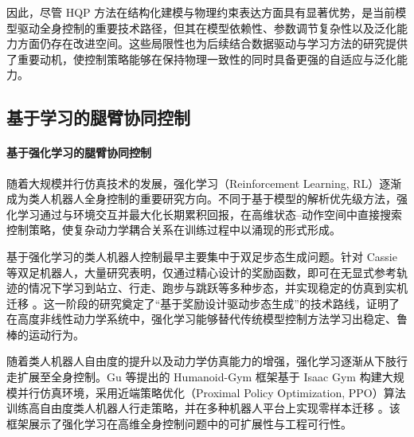 因此，尽管 HQP 方法在结构化建模与物理约束表达方面具有显著优势，是当前模型驱动全身控制的重要技术路径，但其在模型依赖性、参数调节复杂性以及泛化能力方面仍存在改进空间。这些局限性也为后续结合数据驱动与学习方法的研究提供了重要动机，使控制策略能够在保持物理一致性的同时具备更强的自适应与泛化能力。

\subsection{基于学习的腿臂协同控制}

\paragraph{基于强化学习的腿臂协同控制}

随着大规模并行仿真技术的发展，强化学习（Reinforcement Learning, RL）逐渐成为类人机器人全身控制的重要研究方向\cite{sutton1998reinforcement,heess2017emergence,hwangbo2019learning}。不同于基于模型的解析优先级方法，强化学习通过与环境交互并最大化长期累积回报，在高维状态–动作空间中直接搜索控制策略，使复杂动力学耦合关系在训练过程中以涌现的形式形成\cite{peng2018deepmimic,lee2020learning,焦彤宇2022}。

基于强化学习的类人机器人控制最早主要集中于双足步态生成问题。针对 Cassie 等双足机器人，大量研究表明，仅通过精心设计的奖励函数，即可在无显式参考轨迹的情况下学习到站立、行走、跑步与跳跃等多种步态，并实现稳定的仿真到实机迁移 \cite{Siekmann2021AllGaits}。这一阶段的研究奠定了“基于奖励设计驱动步态生成”的技术路线，证明了在高度非线性动力学系统中，强化学习能够替代传统模型控制方法学习出稳定、鲁棒的运动行为。

随着类人机器人自由度的提升以及动力学仿真能力的增强，强化学习逐渐从下肢行走扩展至全身控制。Gu 等提出的 Humanoid-Gym 框架基于 Isaac Gym 构建大规模并行仿真环境，采用近端策略优化（Proximal Policy Optimization, PPO）算法训练高自由度类人机器人行走策略，并在多种机器人平台上实现零样本迁移 \cite{Gu2024HumanoidGym}。该框架展示了强化学习在高维全身控制问题中的可扩展性与工程可行性。

